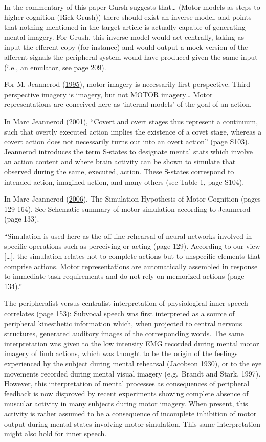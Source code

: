 \documentclass[a4paper,12pt,twoside,openright,oldfontcommands]{memoir}
\begin{document}
In the commentary of this paper Gursh suggests that\ldots{} (Motor
models as steps to higher cognition (Rick Grush)) there should exist an
inverse model, and points that nothing mentioned in the target article
is actually capable of generating mental imagery. For Grush, this
inverse model would act centrally, taking as input the efferent copy
(for instance) and would output a mock version of the afferent signals
the peripheral system would have produced given the same input (i.e., an
emulator, see page 209).

For M. Jeannerod (\protect\hyperlink{ref-jeannerod_mental_1995}{1995}),
motor imagery is necessarily first-perspective. Third perspective
imagery is imagery, but not MOTOR imagery\ldots{} Motor representations
are conceived here as `internal models' of the goal of an action.

In Marc Jeannerod (\protect\hyperlink{ref-jeannerod_neural_2001}{2001}),
``Covert and overt stages thus represent a continuum, such that overtly
executed action implies the existence of a covet stage, whereas a covert
action does not necessarily turns out into an overt action'' (page
S103). Jeannerod introduces the term S-states to designate mental stats
which involve an action content and where brain activity can be shown to
simulate that observed during the same, executed, action. These S-states
correspond to intended action, imagined action, and many others (see
Table 1, page S104).

In Marc Jeannerod (\protect\hyperlink{ref-jeannerod_motor_2006}{2006}),
The Simulation Hypothesis of Motor Cognition (pages 129-164). See
Schematic summary of motor simulation according to Jeannerod (page 133).

``Simulation is used here as the off-line rehearsal of neural networks
involved in specific operations such as perceiving or acting (page 129).
According to our view {[}\ldots{}{]}, the simulation relates not to
complete actions but to unspecific elements that comprise actions. Motor
representations are automatically assembled in response to immediate
task requirements and do not rely on memorized actions (page 134).''

The peripheralist versus centralist interpretation of physiological
inner speech correlates (page 153): Subvocal speech was first
interpreted as a source of peripheral kinesthetic information which,
when projected to central nervous structures, generated auditory images
of the corresponding words. The same interpretation was given to the low
intensity EMG recorded during mental motor imagery of limb actions,
which was thought to be the origin of the feelings experienced by the
subject during mental rehearsal (Jacobson 1930), or to the eye movements
recorded during mental visual imagery (e.g.~Brandt and Stark, 1997).
However, this interpretation of mental processes as consequences of
peripheral feedback is now disproved by recent experiments showing
complete absence of muscular activity in many subjects during motor
imagery. When present, this activity is rather assumed to be a
consequence of incomplete inhibition of motor output during mental
states involving motor simulation. This same interpretation might also
hold for inner speech.
\end{document}
